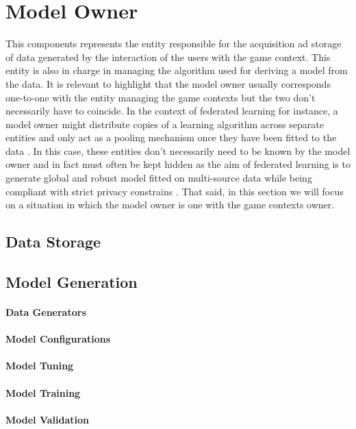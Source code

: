 \section{Model Owner}
\label{model_owner}
This components represents the entity responsible for the acquisition ad storage of data generated by the interaction of the users with the game context. This entity is also in charge in managing the algorithm used for deriving a model from the data. It is relevant to highlight that the model owner usually corresponds one-to-one with the entity managing the game contexts but the two don't necessarily  have to coincide. In the context of federated learning  \cite{yang2019federated} for instance, a model owner might distribute copies of a learning algorithm across separate entities and only act as a pooling mechanism  once they have been fitted to the data \cite{kairouz2021advances}. In this case, these entities don't necessarily need to be known by the model owner and in fact must often be kept hidden as the aim of federated learning is to generate global and robust model fitted on multi-source data while being compliant with strict privacy constrains \cite{yang2019federated, kairouz2021advances}. That said, in this section we will focus on a situation in which the model owner is one with the game contexts owner.

\subsection{Data Storage}
\lorem
\subsection{Model Generation}
\lorem
\paragraph*{Data Generators} \lorem
\paragraph*{Model Configurations} \lorem
\paragraph*{Model Tuning} \lorem
\paragraph*{Model Training} \lorem
\paragraph*{Model Validation} \lorem
